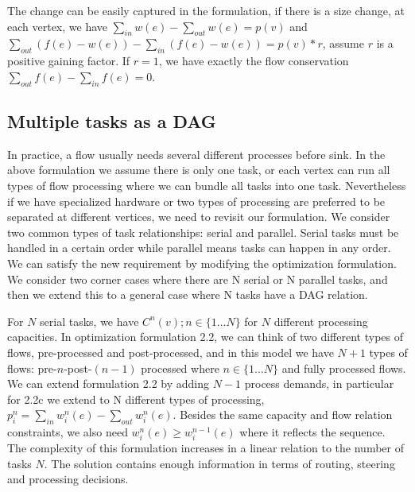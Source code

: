 The change can be easily captured in the formulation, if there is a size change, at each vertex, we have $\sum\limits_{in} w(e) - \sum\limits_{out}  w(e) = p(v)$ and $\sum\limits_{out} (f(e) - w(e))-\sum\limits_{in}  (f(e) - w(e))= p(v)*r$, assume $r$ is a positive gaining factor. If $r=1$, we have exactly the flow conservation $\sum\limits_{out} f(e) -\sum\limits_{in}  f(e)= 0$. 


\subsection{Multiple tasks as a DAG}
In practice, a flow usually needs several different processes before sink. In the above formulation we assume there is only one task, or each vertex can run all types of flow processing where we can bundle all tasks into one task. Nevertheless if we have specialized hardware or two types of processing are preferred to be separated at different vertices, we need to revisit our formulation. 
We consider two common types of task relationships: serial and parallel. Serial tasks must be handled in a certain order while parallel means tasks can happen in any order. We can satisfy the new requirement by modifying the optimization formulation. We consider two corner cases where there are N serial or N parallel tasks, and then we extend this to a general case where N tasks have a DAG relation. 

For $N$ serial tasks, we have $C^n(v); n\in\{1\dots N\}$ for $N$ different processing capacities. In optimization formulation 2.2, we can think of two different types of flows, pre-processed and post-processed, and in this model we have $N+1$ types of flows: pre-$n$-post-$(n-1)$ processed where $ n\in\{1\dots N\}$ and  fully processed flows. We can extend formulation 2.2 by adding $N-1$ process demands, in particular for 2.2c we extend to N different types of processing, $p_i^n= \sum\limits_{in} w_i^n(e) - \sum\limits_{out} w_i^n(e)$. Besides the same capacity and flow relation constraints, we also need $w_i^n(e) \geq w_i^{n-1}(e)$ where it reflects the sequence. The complexity of this formulation increases in a linear relation to the number of tasks $N$. The solution contains enough information in terms of routing, steering and processing decisions.

